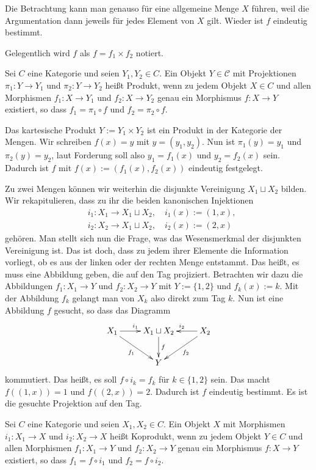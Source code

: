 Die Betrachtung kann man genauso für eine allgemeine Menge $X$ führen,
weil die Argumentation dann jeweils für jedes Element von $X$ gilt.
Wieder ist $f$ eindeutig bestimmt.

Gelegentlich wird $f$ als $f=f_1\times f_2$ notiert.

\begin{Definition}[Produkt]\newlinefirst
Sei $C$ eine Kategorie und seien $Y_1,Y_2\in C$.
Ein Objekt $Y\in\mathcal C$ mit Projektionen $\pi_1\colon Y\to Y_1$ und
$\pi_2\colon Y\to Y_2$ heißt Produkt, wenn zu jedem Objekt
$X\in C$ und allen Morphismen $f_1\colon X\to Y_1$
und $f_2\colon X\to Y_2$ genau ein Morphismus $f\colon X\to Y$
existiert, so dass $f_1=\pi_1\circ f$ und $f_2=\pi_2\circ f$.
\end{Definition}

\noindent
Das kartesische Produkt $Y:=Y_1\times Y_2$ ist ein Produkt in
der Kategorie der Mengen. Wir schreiben $f(x)=y$ mit $y=(y_1,y_2)$.
Nun ist $\pi_1(y)=y_1$ und $\pi_2(y)=y_2$, laut Forderung soll also
$y_1=f_1(x)$ und $y_2=f_2(x)$ sein. Dadurch ist $f$ mit
$f(x):=(f_1(x),f_2(x))$ eindeutig festgelegt.

Zu zwei Mengen können wir weiterhin die disjunkte Vereinigung
$X_1\sqcup X_2$ bilden. Wir rekapitulieren, dass zu ihr die beiden
kanonischen Injektionen
\begin{align*}
& i_1\colon X_1\to X_1\sqcup X_2,\quad i_1(x) := (1,x),\\
& i_2\colon X_2\to X_1\sqcup X_2,\quad i_2(x) := (2,x)
\end{align*}
gehören. Man stellt sich nun die Frage, was das Wesensmerkmal
der disjunkten Vereinigung ist. Das ist doch, dass zu jedem ihrer
Elemente die Information vorliegt, ob es aus der linken oder der
rechten Menge entstammt. Das heißt, es muss eine Abbildung geben,
die auf den Tag projiziert. Betrachten wir dazu die Abbildungen
$f_1\colon X_1\to Y$ und $f_2\colon X_2\to Y$ mit $Y:=\{1,2\}$ und
$f_k(x):=k$. Mit der Abbildung $f_k$ gelangt man von $X_k$ also
direkt zum Tag $k$. Nun ist eine Abbildung $f$ gesucht, so dass das
Diagramm
\[\xymatrix{
X_1\ar[r]^{i_1}\ar[dr]_{f_1} & X_1\sqcup X_2\ar[d]^{f}
& X_2\ar[l]_{i_2}\ar[dl]^{f_2}\\
& Y &
}\]
kommutiert. Das heißt, es soll $f\circ i_k = f_k$ für $k\in\{1,2\}$ sein.
Das macht $f((1,x)) = 1$ und $f((2,x)) = 2$. Dadurch ist $f$ eindeutig
bestimmt. Es ist die gesuchte Projektion auf den Tag.

\begin{Definition}[Koprodukt]\newlinefirst
Sei $C$ eine Kategorie und seien $X_1,X_2\in C$. Ein Objekt $X$
mit Morphismen $i_1\colon X_1\to X$ und $i_2\colon X_2\to X$
heißt Koprodukt, wenn zu jedem Objekt $Y\in C$ und allen Morphismen
$f_1\colon X_1\to Y$ und $f_2\colon X_2\to Y$ genau ein Morphismus
$f\colon X\to Y$ existiert, so dass $f_1 = f\circ i_1$
und $f_2 = f\circ i_2$.
\end{Definition}

